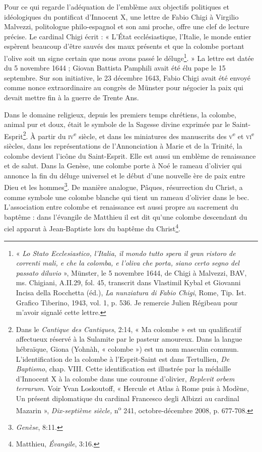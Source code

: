 \documentclass[12pt,twoside,openany]{book}
\begin{document}
Pour ce qui regarde l’adéquation de l’emblème aux objectifs politiques et idéologiques du pontificat d’Innocent X, une lettre de Fabio Chigi à Virgilio Malvezzi, politologue philo-espagnol et son ami proche, offre une clef de lecture précise. Le cardinal Chigi écrit : « L’État ecclésiastique, l’Italie, le monde entier espèrent beaucoup d’être sauvés des maux présents et que la colombe portant l’olive soit un signe certain que nous avons passé le déluge\footnote{« \textit{Lo Stato Ecclesiastico, l’Italia, il mondo tutto spera il gran ristoro de correnti mali, e che la colomba, e l’oliva che porta, siano certo segno del passato diluvio} », Münster, le 5 novembre 1644, de Chigi à Malvezzi, BAV, ms. Chigiani, A.II.29, fol. 45, transcrit dans Vlastimil Kybal et Giovanni Incisa della Rocchetta (éd.), \textit{La nunziatura di Fabio Chigi}, Rome, Tip. Ist. Grafico Tiberino, 1943, vol. 1, p. 536. Je remercie Julien Régibeau pour m’avoir signalé cette lettre.}. » La lettre est datée du 5 novembre 1644 ; Giovan Battista Pamphili avait été élu pape le 15 septembre. Sur son initiative, le 23 décembre 1643, Fabio Chigi avait été envoyé comme nonce extraordinaire au congrès de Münster pour négocier la paix qui devait mettre fin à la guerre de Trente Ans.

Dans le domaine religieux, depuis les premiers temps chrétiens, la colombe, animal pur et doux, était le symbole de la Sagesse divine exprimée par le Saint-Esprit\footnote{Dans le \textit{Cantique des Cantiques}, 2:14, « Ma colombe » est un qualificatif affectueux réservé à la Sulamite par le pasteur amoureux. Dans la langue hébraïque, Giona (Yohnàh, « colombe ») est un nom masculin commun. L’identification de la colombe à l’Esprit-Saint est dans Tertullien, \textit{De Baptismo}, chap. VIII. Cette identification est illustrée par la médaille d’Innocent X à la colombe dans une couronne d’olivier, \textit{Replevit orbem terrarum}. Voir Yvan Loskoutoff, « Hercule et Atlas à Rome puis à Modène, Un présent diplomatique du cardinal Francesco degli Albizzi au cardinal Mazarin », \textit{Dix-septième siècle,} n\textsuperscript{o} 241, octobre-décembre 2008, p. 677-708.}. À partir du \textsc{iv}\textsuperscript{e} siècle, et dans les miniatures des manuscrits des \textsc{v}\textsuperscript{e} et \textsc{vi}\textsuperscript{e} siècles, dans les représentations de l’Annonciation à Marie et de la Trinité, la colombe devient l’icône du Saint-Esprit. Elle est aussi un emblème de renaissance et de salut. Dans la Genèse, une colombe porte à Noé le rameau d’olivier qui annonce la fin du déluge universel et le début d’une nouvelle ère de paix entre Dieu et les hommes\footnote{\textit{Genèse}, 8:11.}. De manière analogue, Pâques, résurrection du Christ, a comme symbole une colombe blanche qui tient un rameau d’olivier dans le bec. L’association entre colombe et renaissance est aussi propre au sacrement du baptême : dans l’évangile de Matthieu il est dit qu’une colombe descendant du ciel apparut à Jean-Baptiste lors du baptême du Christ\footnote{Matthieu, \textit{Évangile}, 3:16.}.
\end{document}
